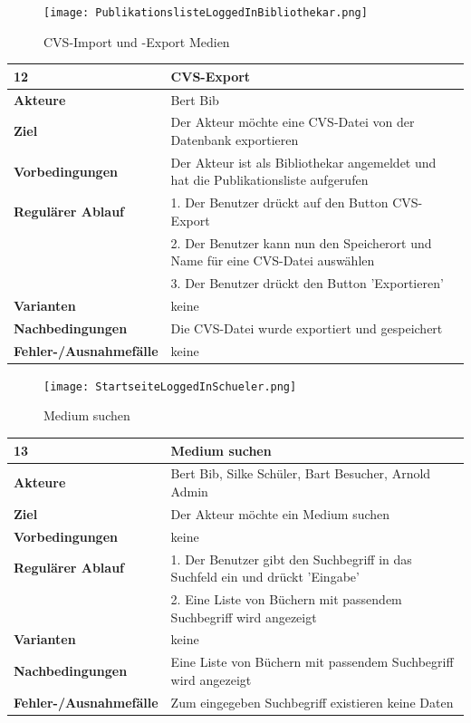 \documentclass[fontsize=12pt,paper=a4,twoside]{scrartcl}
\begin{document}
\begin{figure}
	[H] \caption{CVS-Import und -Export Medien} 
	\texttt{[image: PublikationslisteLoggedInBibliothekar.png]} \label{pic:CVS-ImportMed} 
\end{figure}
\begin{table}
	[H] \label{12} 
	\begin{tabular}
		{|l|p{10cm}|} \hline \textbf{12} & \textbf{CVS-Export} \\
		\hline \textbf{Akteure} & Bert Bib\\
		\hline \textbf{Ziel} & Der Akteur möchte eine CVS-Datei von der Datenbank exportieren \\
		\hline \textbf{Vorbedingungen} & Der Akteur ist als Bibliothekar angemeldet und hat die Publikationsliste aufgerufen \\
		\hline \textbf{Regulärer Ablauf} & 1. Der Benutzer drückt auf den Button CVS-Export \\
		&2. Der Benutzer kann nun den Speicherort und Name für eine CVS-Datei auswählen\\
		&3. Der Benutzer drückt den Button 'Exportieren'\\
		\hline \textbf{Varianten} & keine \\
		\hline \textbf{Nachbedingungen} & Die CVS-Datei wurde exportiert und gespeichert\\
		\hline \textbf{Fehler-/Ausnahmefälle} & keine\\
		\hline 
	\end{tabular}
\end{table}
\begin{figure}
	[H] \caption{Medium suchen} 
	\texttt{[image: StartseiteLoggedInSchueler.png]} \label{pic:MedSuche} 
\end{figure}
\begin{table}
	[H] \label{13} 
	\begin{tabular}
		{|l|p{10cm}|} \hline \textbf{13} & \textbf{Medium suchen} \\
		\hline \textbf{Akteure} & Bert Bib, Silke Schüler, Bart Besucher, Arnold Admin\\
		\hline \textbf{Ziel} & Der Akteur möchte ein Medium suchen \\
		\hline \textbf{Vorbedingungen} & keine \\
		\hline \textbf{Regulärer Ablauf} & 1. Der Benutzer gibt den Suchbegriff in das Suchfeld ein und drückt 'Eingabe' \\
		&2. Eine Liste von Büchern mit passendem Suchbegriff wird angezeigt\\
		\hline \textbf{Varianten} & keine \\
		\hline \textbf{Nachbedingungen} & Eine Liste von Büchern mit passendem Suchbegriff wird angezeigt\\
		\hline \textbf{Fehler-/Ausnahmefälle} & Zum eingegeben Suchbegriff existieren keine Daten\\
		\hline 
	\end{tabular}
\end{table}
\end{document}
